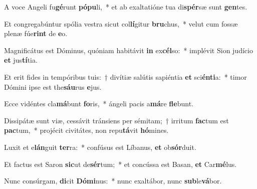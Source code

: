 \item A voce Angeli fu\textbf{gé}runt \textbf{pó}\textbf{pu}li,~* et ab exaltatióne tua di\textbf{spér}sæ sunt \textbf{gen}tes.
\item Et congregabúntur spólia vestra sicut col\textbf{lí}gitur \textbf{bru}chus,~* velut cum fossæ plenæ fúe\textbf{rint} de \textbf{e}o.
\item Magnificátus est Dóminus, quóniam habitávit \textbf{in} ex\textbf{cél}so:~* implévit Sion judício \textbf{et} jus\textbf{tí}tia.
\item Et erit fides in tempóribus tuis:~† divítiæ salútis sapiéntia \textbf{et} sci\textbf{én}\textbf{ti}a:~* timor Dómini ipse est the\textbf{sáu}rus \textbf{e}jus.
\item Ecce vidéntes cla\textbf{má}bunt \textbf{fo}ris,~* ángeli pacis a\textbf{má}re \textbf{fle}bunt.
\item Dissipátæ sunt viæ, cessávit tránsiens per sémitam;~† irritum \textbf{fac}tum est \textbf{pac}tum,~* projécit civitátes, non repu\textbf{tá}vit \textbf{hó}mines.
\item Luxit et e\textbf{lán}guit \textbf{ter}ra:~* confúsus est Líbanus, \textbf{et} ob\textbf{sór}duit.
\item Et factus est Saron \textbf{sic}ut de\textbf{sér}tum;~* et concússa est Basan, \textbf{et} Car\textbf{mé}lus.
\item Nunc consúrgam, \textbf{di}cit \textbf{Dó}\textbf{mi}nus:~* nunc exaltábor, nunc \textbf{sub}le\textbf{vá}bor.
